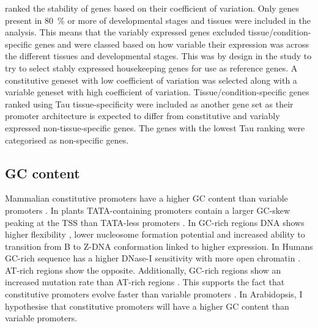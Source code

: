 \documentclass[../main.tex]{subfiles}
\begin{document}
\textcite{czechowskiGenomeWideIdentificationTesting2005} ranked the stability of genes based on their coefficient of variation. Only genes present in \SI{80}{\percent} or more of developmental stages and tissues were included in the analysis. This means that the variably expressed genes excluded tissue/condition\hyp{}specific genes and were classed based on how variable their expression was across the different tissues and developmental stages. This was by design in the study to try to select stably expressed housekeeping genes for use as reference genes. A constitutive geneset with low coefficient of variation was selected along with a variable geneset with high coefficient of variation. Tissue/condition\hyp{}specific genes ranked using Tau tissue-specificity were included as another gene set as their promoter architecture is expected to differ from constitutive and variably expressed non-tissue-specific genes. The genes with the lowest Tau ranking were categorised as non-specific genes.

\subsection{GC content}
\label{chapter1:introduction:gc-content}

Mammalian constitutive promoters have a higher GC content than variable promoters \autocite{vinogradovDNAHelixImportance2017,weiCharacterizationGenePromoters2019}.
In plants TATA-containing promoters contain a larger GC-skew peaking at the TSS than TATA-less promoters \autocite{zuoIdentificationTATATATAless2011}.
In GC-rich regions DNA shows higher flexibility \autocite{vinogradovBendableGenesWarmblooded2001,vinogradovDNAHelixImportance2003}, lower nucleosome formation potential \autocite{vinogradovNoncodingDNAIsochores2005} and increased ability to transition from B to Z-DNA conformation \autocite{vinogradovDNAHelixImportance2003} linked to higher expression.
In Humans GC-rich sequence has a higher DNase-I sensitivity with more open chromatin \autocite{difilippoMappingDNaseIHypersensitive2008}.
AT-rich regions show the opposite.
Additionally, GC-rich regions show an increased mutation rate than AT-rich regions \autocite{vinogradovDNAHelixImportance2017}.
This supports the fact that constitutive promoters evolve faster than variable promoters \autocite{farreHousekeepingGenesTend2007,carninciGenomewideAnalysisMammalian2006}.
In Arabidopsis, I hypothesise that constitutive promoters will have a higher GC content than variable promoters.
\end{document}
